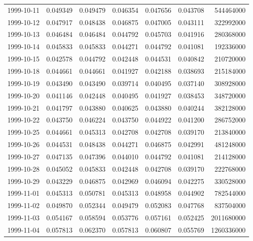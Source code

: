 \begin{tabular}{lrrrrrr}
1999-10-11 &    0.049349 &    0.049479 &    0.046354 &    0.047656 &    0.043708 &   544464000 \\
1999-10-12 &    0.047917 &    0.048438 &    0.046875 &    0.047005 &    0.043111 &   322992000 \\
1999-10-13 &    0.046484 &    0.046484 &    0.044792 &    0.045703 &    0.041916 &   280368000 \\
1999-10-14 &    0.045833 &    0.045833 &    0.044271 &    0.044792 &    0.041081 &   192336000 \\
1999-10-15 &    0.042578 &    0.044792 &    0.042448 &    0.044531 &    0.040842 &   210720000 \\
1999-10-18 &    0.044661 &    0.044661 &    0.041927 &    0.042188 &    0.038693 &   215184000 \\
1999-10-19 &    0.043490 &    0.043490 &    0.039714 &    0.040495 &    0.037140 &   308928000 \\
1999-10-20 &    0.041146 &    0.042448 &    0.040495 &    0.041927 &    0.038453 &   348720000 \\
1999-10-21 &    0.041797 &    0.043880 &    0.040625 &    0.043880 &    0.040244 &   382128000 \\
1999-10-22 &    0.043750 &    0.046224 &    0.043750 &    0.044922 &    0.041200 &   286752000 \\
1999-10-25 &    0.044661 &    0.045313 &    0.042708 &    0.042708 &    0.039170 &   213840000 \\
1999-10-26 &    0.044531 &    0.048438 &    0.044271 &    0.046875 &    0.042991 &   481248000 \\
1999-10-27 &    0.047135 &    0.047396 &    0.044010 &    0.044792 &    0.041081 &   214128000 \\
1999-10-28 &    0.045052 &    0.045833 &    0.042448 &    0.042708 &    0.039170 &   222768000 \\
1999-10-29 &    0.043229 &    0.046875 &    0.042969 &    0.046094 &    0.042275 &   330528000 \\
1999-11-01 &    0.045313 &    0.050781 &    0.045313 &    0.048958 &    0.044902 &   782544000 \\
1999-11-02 &    0.049870 &    0.052344 &    0.049479 &    0.052083 &    0.047768 &   837504000 \\
1999-11-03 &    0.054167 &    0.058594 &    0.053776 &    0.057161 &    0.052425 &  2011680000 \\
1999-11-04 &    0.057813 &    0.062370 &    0.057813 &    0.060807 &    0.055769 &  1260336000 \\

\end{tabular}
